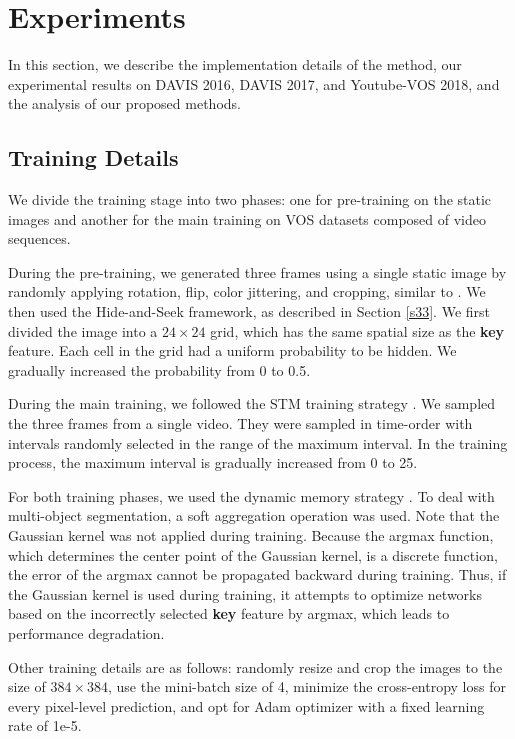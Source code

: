 \documentclass[runningheads]{llncs}
\begin{document}
\section{Experiments}
\label{s4}
In this section, we describe the implementation details of the method, our experimental results on DAVIS 2016, DAVIS 2017, and Youtube-VOS 2018, and the analysis of our proposed methods.

\subsection{Training Details}
\label{s41}
We divide the training stage into two phases: one for pre-training on the static images and another for the main training on VOS datasets composed of video sequences.

During the pre-training, we generated three frames using a single static image by randomly applying rotation, flip, color jittering, and cropping, similar to \cite{wug2018fast,Oh_2019_ICCV}. We then used the Hide-and-Seek framework, as described in Section \ref{s33}. We first divided the image into a $24 \times 24$ grid, which has the same spatial size as the \textbf{key} feature. Each cell in the grid had a uniform probability to be hidden. We gradually increased the probability from 0 to 0.5.

During the main training, we followed the STM training strategy \cite{Oh_2019_ICCV}. We sampled the three frames from a single video. They were sampled in time-order with intervals randomly selected in the range of the maximum interval. In the training process, the maximum interval is gradually increased from 0 to 25.

For both training phases, we used the dynamic memory strategy \cite{Oh_2019_ICCV}. To deal with multi-object segmentation, a soft aggregation operation \cite{Oh_2019_ICCV} was used. Note that the Gaussian kernel was not applied during training. Because the argmax function, which determines the center point of the Gaussian kernel, is a discrete function, the error of the argmax cannot be propagated backward during training. Thus, if the Gaussian kernel is used during training, it attempts to optimize networks based on the incorrectly selected \textbf{key} feature by argmax, which leads to performance degradation.

Other training details are as follows: randomly resize and crop the images to the size of $384 \times 384$, use the mini-batch size of 4, minimize the cross-entropy loss for every pixel-level prediction, and opt for Adam optimizer \cite{KingmaB14} with a fixed learning rate of 1e-5.
\end{document}
